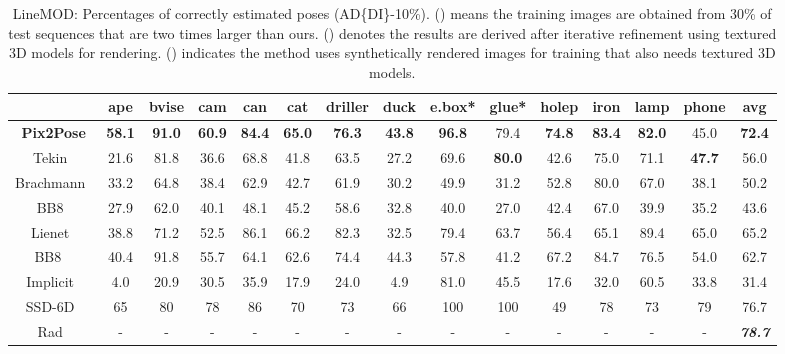 \documentclass[10pt,twocolumn,letterpaper]{article}
\begin{document}
\setlength{\tabcolsep}{4.5pt}
\begin{table*}[ht]
\begin{center}
\begin{tabular}{c | c c c c c c c c c c c c c|c}
 \space &ape & bvise & cam&can & cat & driller & duck & e.box* & glue* & holep & iron & lamp & phone & avg\\
 \hline
 \textbf{Pix2Pose} & \textbf{58.1} & \textbf{91.0} & \textbf{60.9} & \textbf{84.4} & \textbf{65.0} & \textbf{76.3} & \textbf{43.8} & \textbf{96.8} & 79.4 & \textbf{74.8} & \textbf{83.4} & \textbf{82.0} & 45.0 & \textbf{72.4}\\
 
 
Tekin~\cite{Tekin_2018_CVPR} & 21.6 & 81.8 & 36.6 & 68.8 & 41.8 & 63.5 & 27.2 & 69.6 &\textbf{80.0} & 42.6 &75.0 & 71.1 & \textbf{47.7} & 56.0\\
Brachmann~\cite{cnn_pose:brachmann2016uncertainty_only_rgb} & 33.2 & 64.8 & 38.4 & 62.9& 42.7& 61.9&30.2 & 49.9 & 31.2 & 52.8 & 80.0 & 67.0 & 38.1 & 50.2 \\
BB8~\cite{rad2017bb8} & 27.9 & 62.0 & 40.1 & 48.1 &45.2 & 58.6 & 32.8 & 40.0 & 27.0 & 42.4 & 67.0 & 39.9 & 35.2 & 43.6 \\
\hline
Lienet~\cite{Do2018LieNetRM} & 38.8 & 71.2 & 52.5 & 86.1 &66.2 & 82.3 & 32.5 & 79.4 & 63.7 & 56.4 & 65.1 & 89.4 & 65.0 & 65.2 \\
BB8 ~\cite{rad2017bb8} & 40.4 & 91.8 & 55.7 & 64.1 &62.6 & 74.4 & 44.3 & 57.8 & 41.2 & 67.2 & 84.7 & 76.5 & 54.0  & 62.7\\
Implicit~\cite{Sundermeyer_2018_ECCV_implicit} & 4.0 & 20.9 & 30.5 & 35.9 &17.9 & 24.0 & 4.9 & 81.0 & 45.5 & 17.6 & 32.0 & 60.5 & 33.8 & 31.4\\
SSD-6D~\cite{kehl2017ssd} & 65 & 80 & 78 & 86 & 70 & 73 &66 & 100 & 100 & 49 & 78 & 73 & 79 & 76.7\\
Rad~\cite{Rad_2018_CVPR} & - & - & - & - & - & - &- & - & - & - & - & - & - & \textit{\textbf{78.7}}\\


\end{tabular}
\end{center}
\caption{LineMOD: Percentages of correctly estimated poses (AD\{DI\}-10\%). () means the training images are obtained from 30\% of test sequences that are two times larger than ours. () denotes the results are derived after iterative refinement using textured 3D models for rendering. () indicates the method uses synthetically rendered images for training that also needs textured 3D models.}
\label{table_linemod}
\end{table*}
\end{document}
